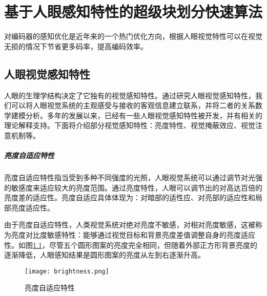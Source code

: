 \chapter{基于人眼感知特性的超级块划分快速算法}
	对编码器的感知优化是近年来的一个热门优化方向，根据人眼视觉特性可以在视觉无损的情况下节省更多码率，提高编码效率。
  \section{人眼视觉感知特性} \label{sec:HVS}
  人眼的生理学结构决定了它独有的视觉感知特性。通过研究人眼视觉感知特性，我们可以将人眼视觉系统的主观感受与接收的客观信息建立联系，并将二者的关系数学建模分析。多年的发展以来，已经有一些人眼视觉感知特性被开发，并有相关的理论解释支持。下面将介绍部分视觉感知特性：亮度特性、视觉掩蔽效应、视觉注意机制等。

  \paragraph{亮度自适应特性} 亮度自适应特性指当受到多种不同强度的光照，人眼视觉系统可以通过调节对光强的敏感度来适应较大的亮度范围。通过亮度特性，人眼可以调节出的对高达百倍的亮度差的适应性。亮度自适应具体体现为：对暗部的适性应、对亮部的适应性和局部亮度适应性。

  由于亮度自适应特性，人类视觉系统对绝对亮度不敏感，对相对亮度敏感，这被称为亮度对比度敏感特性：能够通过视觉目标和背景亮度差值调整自身的亮度适应性。如图\ref{fig:brightness}，尽管五个圆形图案的亮度完全相同，但随着外部正方形背景亮度的逐渐降低，人眼感知结果是圆形图案的亮度从左到右逐渐升高。

  \begin{figure}[!htp]
		\centering
		\texttt{[image: brightness.png]}
		\caption{亮度自适应特性}
		\label{fig:brightness}
	\end{figure}


